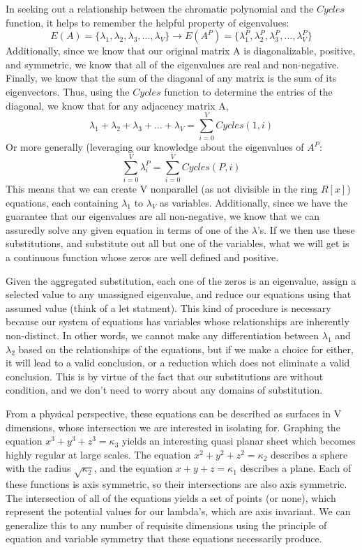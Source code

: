 In seeking out a relationship between the chromatic polynomial and the $Cycles$ function, it helps to remember the helpful property of  eigenvalues:
$$E(A) = \{\lambda_1,\lambda_2,\lambda_3, \dots, \lambda_V\} \rightarrow E(A^P) = \{\lambda_1^P,\lambda_2^P,\lambda_3^P, \dots, \lambda_V^P\} $$
Additionally, since we know that our original matrix A is diagonalizable, positive, and symmetric, we know that all of the eigenvalues are real and non-negative. 
Finally, we know that the sum of the diagonal of any matrix is the sum of its eigenvectors. 
Thus, using the $Cycles$ function to determine the entries of the diagonal, we know that for any adjacency matrix A,
$$\lambda_1 + \lambda_2 + \lambda_3 + \dots + \lambda_V = \sum_{i = 0}^{V}{Cycles(1, i)}$$
Or more generally (leveraging our knowledge about the eigenvalues of $A^P$:
$$ \sum_{i = 0}^V{\lambda_i^P} =  \sum_{i = 0}^{V}{Cycles(P, i)}$$
This means that we can create V nonparallel (as not divisible in the ring $R[x]$) equations, each containing $\lambda_1$ to $\lambda_V$ as variables.
Additionally, since we have the guarantee that our eigenvalues are all non-negative, we know that we can assuredly solve any given equation in terms of one of the $\lambda$'s.
If we then use these substitutions, and substitute out all but one of the variables, what we will get is a continuous function whose zeros are well defined and positive. 

Given the aggregated substitution, each one of the zeros is an eigenvalue, assign a selected value to any unassigned eigenvalue, and reduce our equations using that assumed value (think of a let statment).
This kind of procedure is necessary because our system of equations has variables whose relationships are inherently non-distinct.
In other words, we cannot make any differentiation between $\lambda_1$ and $\lambda_2$ based on the relationships of the equations, but if we make a choice for either, it will lead to a valid conclusion, or a reduction which does not eliminate a valid conclusion.
This is by virtue of the fact that our substitutions are without condition, and we don't need to worry about any domains of substitution.

From a physical perspective, these equations can be described as surfaces in V dimensions, whose intersection we are interested in isolating for. 
Graphing the equation $x^3 + y^3 + z^3 = \kappa_3$ yields an interesting quasi planar sheet which becomes highly regular at large scales.  
The equation $x^2 + y^2 + z^2 = \kappa_2$ describes a sphere with the radius $\sqrt{\kappa_2}$, and the equation $x + y + z = \kappa_1$ describes a plane. 
Each of these functions is axis symmetric, so their intersections are also axis symmetric.  
The intersection of all of the equations yields a set of points (or none), which represent the potential values for our lambda's, which are axis invariant. 
We can generalize this to any number of requisite dimensions using the principle of equation and variable symmetry that these equations necessarily produce.

